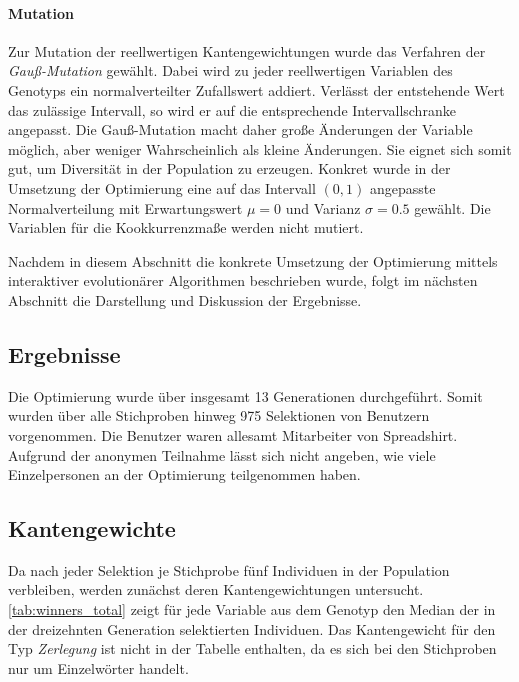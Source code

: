 \paragraph{Mutation}

Zur Mutation der reellwertigen Kantengewichtungen wurde das Verfahren der \emph{Gauß-Mutation} \cite{kw2007} gewählt. Dabei wird zu jeder reellwertigen Variablen des Genotyps ein normalverteilter Zufallswert addiert. Verlässt der entstehende Wert das zulässige Intervall, so wird er auf die entsprechende Intervallschranke angepasst. Die Gauß-Mutation macht daher große Änderungen der Variable möglich, aber weniger Wahrscheinlich als kleine Änderungen. Sie eignet sich somit gut, um Diversität in der Population zu erzeugen. Konkret wurde in der Umsetzung der Optimierung eine auf das Intervall \((0,1)\) angepasste Normalverteilung mit Erwartungswert \(\mu=0\) und Varianz \(\sigma=0.5\) gewählt. Die Variablen für die Kookkurrenzmaße werden nicht mutiert.

Nachdem in diesem Abschnitt die konkrete Umsetzung der Optimierung mittels interaktiver evolutionärer Algorithmen beschrieben wurde, folgt im nächsten Abschnitt die Darstellung und Diskussion der Ergebnisse.

\subsection{Ergebnisse}

Die Optimierung wurde über insgesamt \num{13} Generationen durchgeführt. Somit wurden über alle Stichproben hinweg \num{975} Selektionen von Benutzern vorgenommen. Die Benutzer waren allesamt Mitarbeiter von Spreadshirt. Aufgrund der anonymen Teilnahme lässt sich nicht angeben, wie viele Einzelpersonen an der Optimierung teilgenommen haben.

\subsection{Kantengewichte}

Da nach jeder Selektion je Stichprobe fünf Individuen in der Population verbleiben, werden zunächst deren Kantengewichtungen untersucht. \cref{tab:winners_total} zeigt für jede Variable aus dem Genotyp den Median der in der dreizehnten Generation selektierten Individuen. Das Kantengewicht für den Typ \emph{Zerlegung} ist nicht in der Tabelle enthalten, da es sich bei den Stichproben nur um Einzelwörter handelt.

